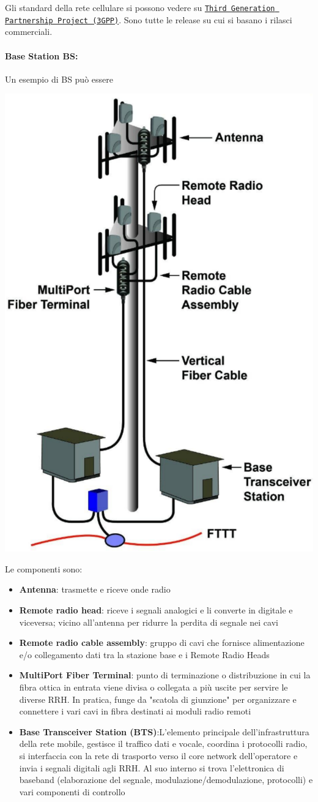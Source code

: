 Gli standard della rete cellulare si possono vedere su \href{https://www.3gpp.org/specifications-technologies/releases}{\texttt{Third Generation Partnership Project (3GPP)}}. Sono tutte le release su cui si basano i rilasci commerciali.\\

\paragraph{Base Station BS:} Un esempio di BS può essere
\begin{center}
	\includegraphics[width=0.4\linewidth]{img/mobile/1BS}
\end{center}

Le componenti sono:
\begin{itemize}
	\item \textbf{Antenna}: trasmette e riceve onde radio
	\item \textbf{Remote radio head}: riceve i segnali analogici e li converte in digitale e viceversa; vicino all'antenna per ridurre la perdita di segnale nei cavi
	\item \textbf{Remote radio cable assembly}: gruppo di cavi che fornisce alimentazione e/o collegamento dati tra la stazione base e i Remote Radio Heads
	\item \textbf{MultiPort Fiber Terminal}: punto di terminazione o distribuzione in cui la fibra ottica in entrata viene divisa o collegata a più uscite per servire le diverse RRH. In pratica, funge da "scatola di giunzione" per organizzare e connettere i vari cavi in fibra destinati ai moduli radio remoti
	\item \textbf{Base Transceiver Station (BTS)}:L'elemento principale dell'infrastruttura della rete mobile, gestisce il traffico dati e vocale, coordina i protocolli radio, si interfaccia con la rete di trasporto verso il core network dell'operatore e invia i segnali digitali agli RRH. Al suo interno si trova l'elettronica di baseband (elaborazione del segnale, modulazione/demodulazione, protocolli) e vari componenti di controllo
\end{itemize}


